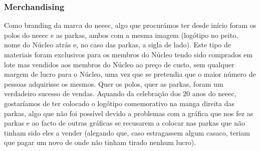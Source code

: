 
\subsubsection{Merchandising}

Como branding da marca do \acrshort{neeec}, algo que procurámos ter desde início foram os polos do \acrshort{neeec} e as parkas, ambos com a mesma imagem (logótipo no peito, nome do Núcleo atrás e, no caso das parkas, a sigla de lado). Este tipo de materiais foram exclusivos para os membros do Núcleo tendo sido comprados em lote mas vendidos aos membros do Núcleo ao preço de custo, sem qualquer margem de lucro para o Núcleo, uma vez que se pretendia que o maior número de pessoas adquirisse os mesmos. Quer os polos, quer as parkas, foram um verdadeiro sucesso de vendas. Aquando da celebração dos 20 anos do \acrshort{neeec}, gostaríamos de ter colocado o logótipo comemorativo na manga direita das parkas, algo que não foi possível devido a problemas com a gráfica que nos fez as parkas e ao facto de outras gráficas se recusarem a colocar nas parkas que não tinham sido eles a vender (alegando que, caso estragassem algum casaco, teriam que pagar um novo de onde não tinham tirado nenhum lucro).